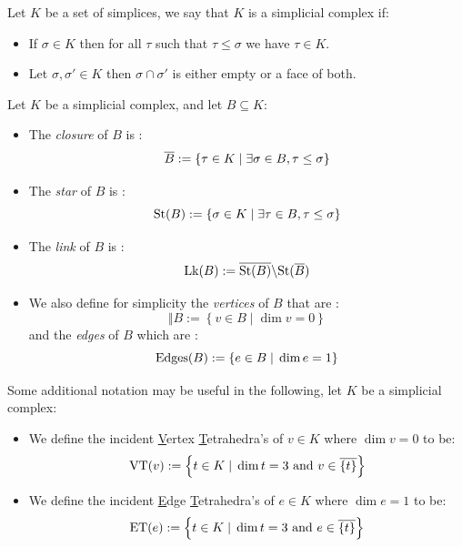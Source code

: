\documentclass[11pt]{article}
\begin{document}
\begin{definition}

	Let $K$ be a set of simplices, we say that $K$ is a simplicial complex if:

	\begin{itemize}

		\item If $\sigma\in K$ then for all $\tau$ such that $\tau\leq\sigma$ we have $\tau\in K$.

		\item Let $\sigma, \sigma'\in K$ then $\sigma\cap\sigma'$ is either empty or a face of both.

	\end{itemize}

\end{definition}

\begin{definition}

	Let $K$ be a simplicial complex, and let $B\subseteq K$:

	\begin{itemize}

		\item The \emph{closure} of $B$ is : $$\overline{B} := \left\{\tau\in K\; |\; \exists\sigma\in B,
			      \tau\leq\sigma\right\}$$

		\item The \emph{star} of $B$ is : $$\mathrm{St}(B) := \left\{\sigma\in K\; |\; \exists\tau\in B,
			      \tau\leq\sigma\right\}$$

		\item The \emph{link} of $B$ is : $$\mathrm{Lk}(B) := \overline{\mathrm{St}(B)} \backslash \mathrm{St}(\overline{B})$$

		\item We also define for simplicity the \emph{vertices} of $B$ that are : $$\Vert{B} := \left\{v\in B\;|\; \dim v = 0\right\}$$ and the
		      \emph{edges} of $B$ which are : $$\mathrm{Edges}(B) := \left\{e\in B\;|\; \dim e = 1\right\}$$

	\end{itemize}

\end{definition}

\begin{definition}
	Some additional notation may be useful in the following, let $K$ be a simplicial complex:

	\begin{itemize}
		\item We define the incident \underline{V}ertex \underline{T}etrahedra's of $v\in K$ where $\dim v =
			      0$ to be:
		      $$\mathrm{VT}(v) := \left\{t\in K\;|\;\dim t = 3 \text{ and } v\in\overline{\left\{t\right\}}\right\}$$
		\item We define the incident \underline{E}dge \underline{T}etrahedra's of $e\in K$ where $\dim e =
			      1$ to be:
		      $$\mathrm{ET}(e) := \left\{t\in K\;|\;\dim t = 3 \text{ and } e\in\overline{\left\{t\right\}}\right\}$$
	\end{itemize}
\end{definition}
\end{document}
